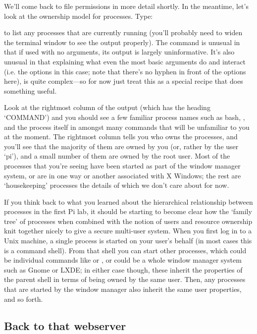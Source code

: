 We'll come back to file permissions in more detail shortly. In the meantime, let's look at the ownership model for processes. Type:


to list any processes that are currently running (you'll probably need to widen the terminal window to see the output properly). The  command is unusual in that if used with no arguments, its output is largely uninformative. It's also unusual in that explaining what even the most basic arguments do and interact (i.e. the  options in this case; note that there's no hyphen in front of the options here), is quite complex---so for now just treat this as a special recipe that does something useful. 

Look at the rightmost column of the output (which has the heading `COMMAND') and you should see a few familiar process names such as bash, , and the  process itself in amongst many commands that will be unfamiliar to you at the moment. The rightmost column tells you who owns the processes, and you'll see that the majority of them are owned by you (or, rather by the user `pi'), and a small number of them are owned by the root user. Most of the processes that you're seeing have been started as part of the window manager system, or are in one way or another associated with X Windows; the rest are `housekeeping' processes the details of which we don't care about for now. 

If you think back to what you learned about the hierarchical relationship between processes in the first Pi lab, it should be starting to become clear how the `family tree' of processes when combined with the notion of users and resource ownership knit together nicely to give a secure multi-user system. When you first log in to a Unix machine, a single process is started on your user's behalf (in most cases this is a command shell). From that shell you can start other processes, which could be individual commands like  or , or could be a whole window manager system such as Gnome or LXDE; in either case though, these inherit the properties of the parent shell in terms of being owned by the same user. Then, any processes that are started by the window manager also inherit the same user properties, and so forth. 

\subsection{Back to that webserver}


